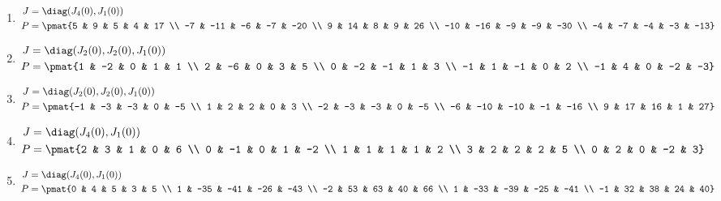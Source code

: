 \begin{enumerate}
\item

\begin{align*}
J &= \diag(J_{4}(0), J_{1}(0))\\
P &= \pmat{5 & 9 & 5 & 4 & 17 \\ -7 & -11 & -6 & -7 & -20 \\ 9 & 14 & 8 & 9 & 26 \\ -10 & -16 & -9 & -9 & -30 \\ -4 & -7 & -4 & -3 & -13}
\end{align*}

\item

\begin{align*}
J &= \diag(J_{2}(0), J_{2}(0), J_{1}(0))\\
P &= \pmat{1 & -2 & 0 & 1 & 1 \\ 2 & -6 & 0 & 3 & 5 \\ 0 & -2 & -1 & 1 & 3 \\ -1 & 1 & -1 & 0 & 2 \\ -1 & 4 & 0 & -2 & -3}
\end{align*}

\item

\begin{align*}
J &= \diag(J_{2}(0), J_{2}(0), J_{1}(0))\\
P &= \pmat{-1 & -3 & -3 & 0 & -5 \\ 1 & 2 & 2 & 0 & 3 \\ -2 & -3 & -3 & 0 & -5 \\ -6 & -10 & -10 & -1 & -16 \\ 9 & 17 & 16 & 1 & 27}
\end{align*}

\item

\begin{align*}
J &= \diag(J_{4}(0), J_{1}(0))\\
P &= \pmat{2 & 3 & 1 & 0 & 6 \\ 0 & -1 & 0 & 1 & -2 \\ 1 & 1 & 1 & 1 & 2 \\ 3 & 2 & 2 & 2 & 5 \\ 0 & 2 & 0 & -2 & 3}
\end{align*}

\item

\begin{align*}
J &= \diag(J_{4}(0), J_{1}(0))\\
P &= \pmat{0 & 4 & 5 & 3 & 5 \\ 1 & -35 & -41 & -26 & -43 \\ -2 & 53 & 63 & 40 & 66 \\ 1 & -33 & -39 & -25 & -41 \\ -1 & 32 & 38 & 24 & 40}
\end{align*}


\end{enumerate}
